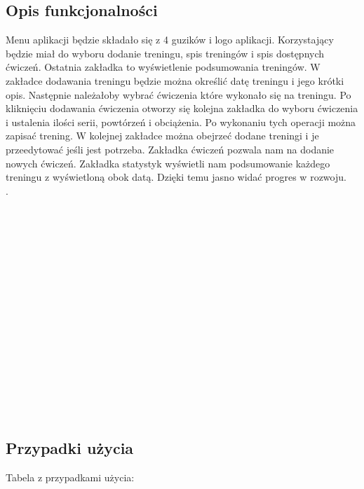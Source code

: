 \documentclass[8pt]{article}
\begin{document}
\subsection*{ Opis funkcjonalności}
Menu aplikacji będzie składało się z 4 guzików i logo aplikacji. Korzystający będzie miał do wyboru dodanie treningu, spis treningów i spis dostępnych ćwiczeń. Ostatnia zakładka to wyświetlenie podsumowania treningów. W zakładce dodawania treningu będzie można określić datę treningu i jego krótki opis. Następnie należałoby wybrać ćwiczenia które wykonało się na treningu. Po kliknięciu dodawania ćwiczenia otworzy się kolejna zakładka do wyboru ćwiczenia i ustalenia ilości serii, powtórzeń i obciążenia. Po wykonaniu tych operacji można zapisać trening. W kolejnej zakładce można obejrzeć dodane treningi i je przeedytować jeśli jest potrzeba. Zakładka ćwiczeń pozwala nam na dodanie nowych ćwiczeń. Zakładka statystyk wyświetli nam podsumowanie każdego treningu z wyświetloną obok datą. Dzięki temu jasno widać progres w rozwoju. \\
.\\
\\
\\
\\
\\
\\
\\
\\
\\
\\
\\
\\
\\
\\
\\
\\
\\
\subsection*{ Przypadki użycia}
Tabela z przypadkami użycia: \\
\end{document}
